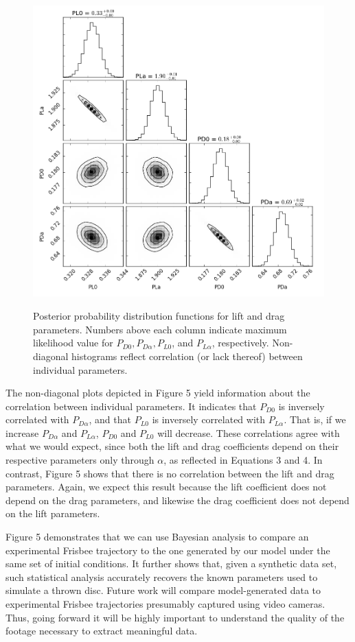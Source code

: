 \documentclass[a4paper,12pt, oneside]{article}
\begin{document}
\begin{figure}[H]
        \includegraphics[width=12cm, height=12cm]{Final_PL0,PLa,PD0,PDa_nsteps=20,000_nwalkers=8}
	\centering
	\caption{Posterior probability distribution functions for lift and drag parameters. Numbers above each column indicate maximum likelihood value for $P_{D0}, P_{D\alpha}, P_{L0}$, and $P_{L\alpha}$, respectively. Non-diagonal histograms reflect correlation (or lack thereof) between individual parameters.}
\end{figure}
The non-diagonal plots depicted in Figure 5 yield information about the correlation between individual parameters. It indicates that $P_{D0}$ is inversely correlated with $P_{D\alpha}$, and that $P_{L0}$ is inversely correlated with $P_{L\alpha}$. That is, if we increase $P_{D\alpha}$ and $P_{L\alpha}$, $P_{D0}$ and $P_{L0}$ will decrease. These correlations agree with what we would expect, since both the lift and drag coefficients depend on their respective parameters only through $\alpha$, as reflected in Equations 3 and 4. In contrast, Figure 5 shows that there is no correlation between the lift and drag parameters. Again, we expect this result because the lift coefficient does not depend on the drag parameters, and likewise the drag coefficient does not depend on the lift parameters.

Figure 5 demonstrates that we can use Bayesian analysis to compare an experimental Frisbee trajectory to the one generated by our model under the same set of initial conditions. It further shows that, given a synthetic data set, such statistical analysis accurately recovers the known parameters used to simulate a thrown disc. Future work will compare model-generated data to experimental Frisbee trajectories presumably captured using video cameras.  Thus, going forward it will be highly important to understand the quality of the footage necessary to extract meaningful data.
\end{document}
